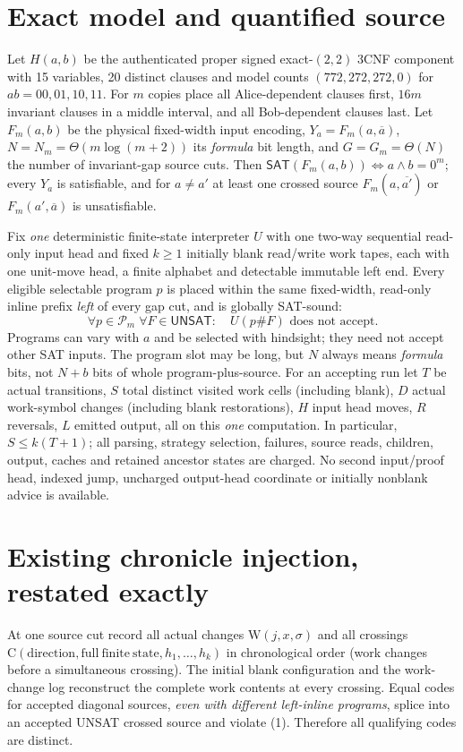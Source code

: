 \documentclass[11pt]{article}
\newcommand{\SAT}{\mathsf{SAT}}
\newcommand{\UNSAT}{\mathsf{UNSAT}}
\begin{document}
\section{Exact model and quantified source}
Let $H(a,b)$ be the authenticated proper signed exact-$(2,2)$ 3CNF
component with 15 variables, 20 distinct clauses and model counts
$(772,272,272,0)$ for $ab=00,01,10,11$.
For $m$ copies place all Alice-dependent clauses first,
$16m$ invariant clauses in a middle interval, and all Bob-dependent
clauses last. Let $F_m(a,b)$ be the physical fixed-width input encoding,
$Y_a=F_m(a,\overline a)$, $N=N_m=\Theta(m\log(m+2))$ its \emph{formula}
bit length, and $G=G_m=\Theta(N)$ the number of invariant-gap
source cuts. Then $\SAT(F_m(a,b))\iff a\land b=0^m$;
every $Y_a$ is satisfiable, and for $a\ne a'$ at least one crossed
source $F_m(a,\overline{a'})$ or $F_m(a',\overline a)$ is unsatisfiable.

Fix \emph{one} deterministic finite-state interpreter $U$ with one
two-way sequential read-only input head and fixed $k\ge1$
initially blank read/write work tapes, each with one unit-move head,
a finite alphabet and detectable immutable left end.
Every eligible selectable program $p$ is placed within the same
fixed-width, read-only inline prefix \emph{left} of every gap cut,
and is globally SAT-sound:
\[
\forall p\in\mathcal P_m\;\forall F\in\UNSAT:\quad
 U(p\#F)\text{ does not accept}.
\tag{1}
\]
Programs can vary with $a$ and be selected with hindsight;
they need not accept other SAT inputs.
The program slot may be long, but $N$ always means \emph{formula}
bits, not $N+b$ bits of whole program-plus-source.
For an accepting run let $T$ be actual transitions,
$S$ total distinct visited work cells (including blank),
$D$ actual work-symbol changes (including blank restorations),
$H$ input head moves, $R$ reversals, $L$ emitted output,
all on this \emph{one} computation. In particular,
$S\le k(T+1)$; all parsing, strategy selection, failures,
source reads, children, output, caches and retained ancestor states
are charged. No second input/proof head, indexed jump, uncharged
output-head coordinate or initially nonblank advice is available.

\section{Existing chronicle injection, restated exactly}
At one source cut record all actual changes
$\mathrm W(j,x,\sigma)$ and all crossings
$\mathrm C(\mathrm{direction},\mathrm{full\ finite\ state},h_1,\ldots,h_k)$
in chronological order (work changes before a simultaneous crossing).
The initial blank configuration and the work-change log reconstruct
the complete work contents at every crossing.
Equal codes for accepted diagonal sources, \emph{even with different
left-inline programs}, splice into an accepted UNSAT crossed source
and violate (1). Therefore all qualifying codes are distinct.
\end{document}
